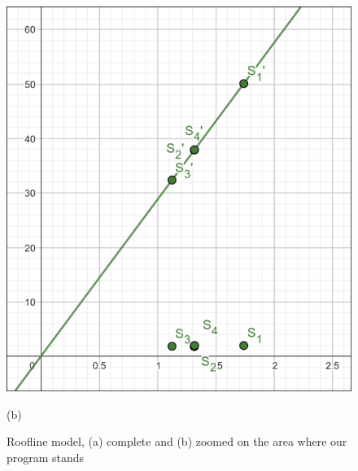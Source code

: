 \begin{figure}[h]
	\includegraphics[width=\textwidth]{images/roofline-zoom.png}
	\caption*{(b)}
	\endminipage\hfill
	\caption{\centering Roofline model, (a) complete and (b) zoomed on the area where our program stands}\label{img:roofline-model}
\end{figure}

